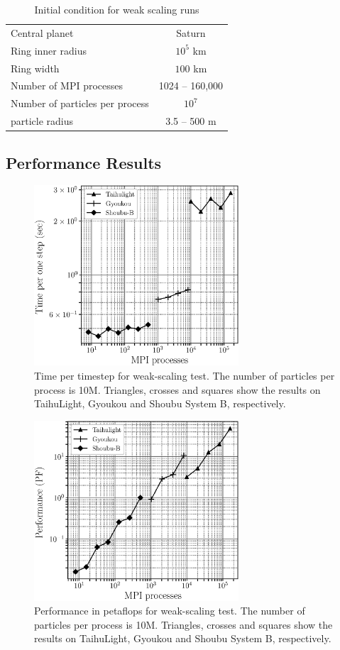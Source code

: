 \documentclass[conference]{IEEEtran}
\begin{document}
\begin{table}
\centering
 \caption{Initial condition for weak scaling runs}
 \label{tab:initialcoditions}
 \begin{tabular}{lc}
\hline
   Central planet & Saturn\\
   Ring inner radius & $10^5$ km\\
   Ring width        & $100$ km\\
   Number of MPI processes & 1024 -- 160,000 \\
   Number of particles per process & $10^7$  \\
   particle radius & 3.5 -- 500 m\\
\hline
\end{tabular}
\end{table}


  
  \subsection{Performance Results}


\begin{figure}
\includegraphics[width=3in]{weak_scaling2}
\caption{Time per timestep for weak-scaling test. The number of
  particles per process is 10M. Triangles, crosses and squares show the
  results on TaihuLight, Gyoukou and Shoubu System B, respectively.
}
\label{fig:weak}
\end{figure}

\begin{figure}
\includegraphics[width=3in]{weak_scaling_speed}
\caption{Performance in petaflops for weak-scaling test.  The number of
  particles per process is 10M. Triangles, crosses and squares show the
  results on TaihuLight, Gyoukou and Shoubu System B, respectively.}
\label{fig:weakpf}
\end{figure}
\end{document}
